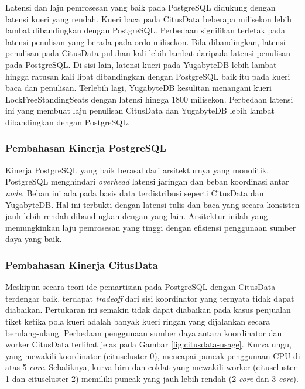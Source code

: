 Latensi dan laju pemrosesan yang baik pada PostgreSQL didukung dengan latensi kueri yang rendah. Kueri baca pada CitusData beberapa milisekon lebih lambat dibandingkan dengan PostgreSQL. Perbedaan signifikan terletak pada latensi penulisan yang berada pada ordo milisekon. Bila dibandingkan, latensi penulisan pada CitusData puluhan kali lebih lambat daripada latensi penulisan pada PostgreSQL. Di sisi lain, latensi kueri pada YugabyteDB lebih lambat hingga ratusan kali lipat dibandingkan dengan PostgreSQL baik itu pada kueri baca dan penulisan. Terlebih lagi, YugabyteDB kesulitan menangani kueri LockFreeStandingSeats dengan latensi hingga 1800 milisekon. Perbedaan latensi ini yang membuat laju penulisan CitusData dan YugabyteDB lebih lambat dibandingkan dengan PostgreSQL.

\subsubsection{Pembahasan Kinerja PostgreSQL}

Kinerja PostgreSQL yang baik berasal dari arsitekturnya yang monolitik. PostgreSQL menghindari \textit{overhead} latensi jaringan dan beban koordinasi antar \textit{node}. Beban ini ada pada basis data terdistribusi seperti CitusData dan YugabyteDB. Hal ini terbukti dengan latensi tulis dan baca yang secara konsisten jauh lebih rendah dibandingkan dengan yang lain. Arsitektur inilah yang memungkinkan laju pemrosesan yang tinggi dengan efisiensi penggunaan sumber daya yang baik.

\subsubsection{Pembahasan Kinerja CitusData}

Meskipun secara teori ide pemartisian pada PostgreSQL dengan CitusData terdengar baik, terdapat \textit{tradeoff} dari sisi koordinator yang ternyata tidak dapat diabaikan. Pertukaran ini semakin tidak dapat diabaikan pada kasus penjualan tiket ketika pola kueri adalah banyak kueri ringan yang dijalankan secara berulang-ulang. Perbedaan penggunaan sumber daya antara koordinator dan worker CitusData terlihat jelas pada Gambar \ref{fig:citusdata-usage}. Kurva ungu, yang mewakili koordinator (cituscluster-0), mencapai puncak penggunaan CPU di atas 5 \textit{core}. Sebaliknya, kurva biru dan coklat yang mewakili worker (cituscluster-1 dan cituscluster-2) memiliki puncak yang jauh lebih rendah (2 \textit{core} dan 3 \textit{core}).

